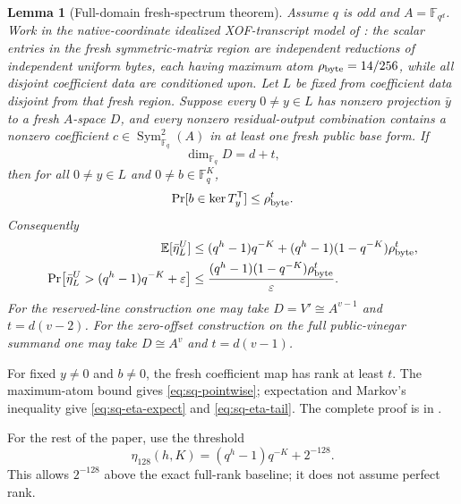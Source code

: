 \documentclass[11pt]{article}
\newtheorem{lemma}[theorem]{Lemma}
\newcommand{\F}{\mathbb F}
\begin{document}
\begin{lemma}[Full-domain fresh-spectrum theorem]
\label{lem:sq-full-domain-spectrum}
Assume $q$ is odd and $A=\F_{q^d}$.  Work in the native-coordinate idealized
XOF-transcript model of : the scalar entries in the
fresh symmetric-matrix region are independent reductions of independent uniform
bytes, each having maximum atom $\rho_{\rm byte}=14/256$, while all disjoint
coefficient data are conditioned upon.  Let $L$ be fixed from coefficient data
disjoint from that fresh region.  Suppose every $0\ne y\in L$
has nonzero projection $\bar y$ to a fresh $A$-space $D$, and every nonzero
residual-output combination contains a nonzero coefficient
$c\in\operatorname{Sym}_{\F_q}^2(A)$ in at least one fresh public base form.
If
\[
 \dim_{\F_q}D=d+t,
\]
then for all $0\ne y\in L$ and $0\ne b\in\F_q^K$,
\begin{equation}
 \Pr[b\in\ker T_y^{\mathsf T}]\le\rho_{\rm byte}^t.             \label{eq:sq-pointwise}
\end{equation}
Consequently
\begin{align}
 \mathbb E[\bar\eta_L^U]
 &\le (q^h-1)q^{-K}
 +(q^h-1)(1-q^{-K})\rho_{\rm byte}^t,                            \label{eq:sq-eta-expect}\\
 \Pr\!\left[
  \bar\eta_L^U>(q^h-1)q^{-K}+\varepsilon
 \right]
 &\le
 \frac{(q^h-1)(1-q^{-K})\rho_{\rm byte}^t}{\varepsilon}.
                                                                    \label{eq:sq-eta-tail}
\end{align}
For the reserved-line construction one may take
$D=V'\cong A^{v-1}$ and $t=d(v-2)$.  For the zero-offset construction on the
full public-vinegar summand one may take $D\cong A^v$ and $t=d(v-1)$.
\end{lemma}

For fixed $y\ne0$ and $b\ne0$, the fresh coefficient map has rank at least
$t$.  The maximum-atom bound gives \eqref{eq:sq-pointwise}; expectation and
Markov's inequality give \eqref{eq:sq-eta-expect} and
\eqref{eq:sq-eta-tail}.  The complete proof is in
.

For the rest of the paper, use the threshold
\begin{equation}
 \boxed{
 \eta_{128}(h,K)=(q^h-1)q^{-K}+2^{-128}.}
 \label{eq:sq-eta128}
\end{equation}
This allows $2^{-128}$ above the exact full-rank baseline; it does not assume
perfect rank.
\end{document}
